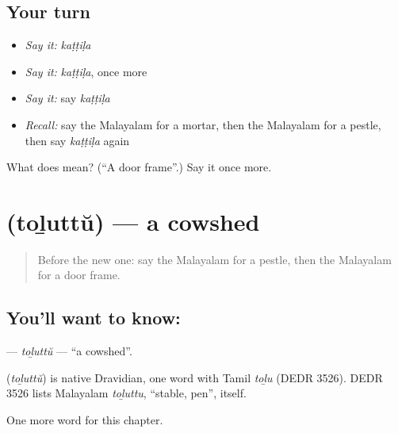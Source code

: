 \subsection*{Your turn}
\begin{itemize}
\raggedright
  \item \emph{Say it:} \emph{kaṭṭiḷa}
  \item \emph{Say it:} \emph{kaṭṭiḷa}, once more
  \item \emph{Say it:} say \emph{kaṭṭiḷa}
  \item \emph{Recall:} say the Malayalam for a mortar, then the Malayalam for a pestle, then say \emph{kaṭṭiḷa} again
\end{itemize}

\begin{tcolorbox}[breakable,colback=teal!4,colframe=teal!35!black,title={Before you move on}]
What does  mean? (\textquotedblleft{}A door frame\textquotedblright{}.) Say it once more.
\end{tcolorbox}
\section[\texorpdfstring{\ml{തൊഴുത്ത്} (toḻuttŭ)}{തൊഴുത്ത് (toḻuttŭ)}]{ (toḻuttŭ) — a cowshed}

\label{lesson:ML-C296-toluttu}



\begin{quote}
Before the new one: say the Malayalam for a pestle, then the Malayalam for a door frame.
\end{quote}

\subsection*{You'll want to know: }
\textbf{} — \emph{toḻuttŭ} — \textquotedblleft{}a cowshed\textquotedblright{}.

\begin{cousinweb}
\textbf{} (\emph{toḻuttŭ}) is native Dravidian, one word with Tamil \emph{toḻu} (DEDR 3526). DEDR 3526 lists Malayalam \emph{toḻuttu}, \textquotedblleft{}stable, pen\textquotedblright{}, itself.
\end{cousinweb}

\begin{grammarlens}[title={What you've built}]
One more word for this chapter.
\end{grammarlens}

